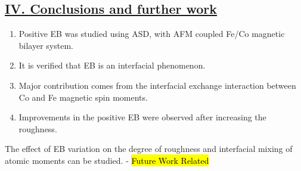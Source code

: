 \subsection*{\underline{IV. Conclusions and further work}}
\begin{enumerate}
    \item Positive EB was studied using ASD, with AFM coupled Fe/Co magnetic bilayer system.
    \item It is verified that EB is an interfacial phenomenon.
    \item Major contribution comes from the interfacial exchange interaction between Co and Fe magnetic spin moments.
    \item Improvements in the positive EB were observed after increasing the roughness.
\end{enumerate}
\vspace{1cm}
The effect of EB variation on the degree of roughness and interfacial mixing of atomic moments can be studied. - \hl{Future Work Related}